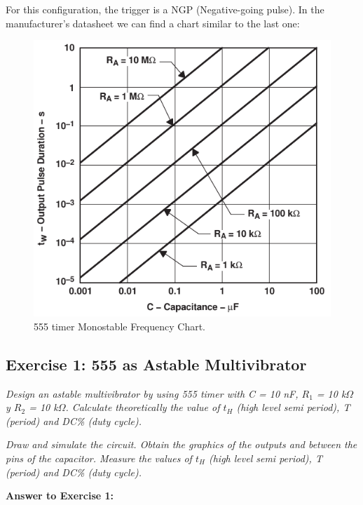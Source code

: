 \documentclass[a4paper, 11pt, oneside]{article}
\begin{document}
For this configuration, the trigger is a NGP (Negative-going pulse). In the manufacturer's datasheet we can find a chart similar to the last one: \medskip

\begin{figure}[H]
    \centering
    \includegraphics[scale = 0.8]{Graphics/Practice 2/GRAPHICS/555/GRAPHS/DATASHEETS/MONOSTABLE_FREQ.pdf}
    \caption{555 timer Monostable Frequency Chart. ~\autocite{555_DS}}
    \label{fig:MONOSTABLE_FREQ}
\end{figure}

\clearpage


\subsection{Exercise 1: 555 as Astable Multivibrator}

\textit{Design an astable multivibrator by using 555 timer with C = 10 nF, $R_1$ = 10 k$\Omega$ y $R_2$ = 10 k$\Omega$. Calculate theoretically the value of $t_H$ (high level semi period), T (period) and DC\% (duty cycle).}\medskip

\textit{Draw and simulate the circuit. Obtain the graphics of the outputs and between the pins of the capacitor. Measure the values of $t_H$ (high level semi period), T (period) and DC\% (duty cycle).}\bigskip

\textbf{\large Answer to Exercise 1:}\medskip
\end{document}
